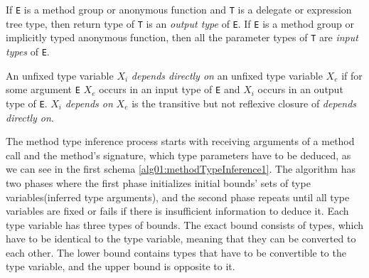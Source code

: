\begin{defn}
If \texttt{E} is a method group or anonymous function and \texttt{T} is a delegate or expression tree type, then return type of \texttt{T} is an \emph{output type} of \texttt{E}.
If \texttt{E} is a method group or implicitly typed anonymous function, then all the parameter types of \texttt{T} are \emph{input types} of \texttt{E}. 
\end{defn}
\par
\begin{defn}[Dependence]
An unfixed type variable \texttt{$X_i$} \emph{depends directly on} an unfixed type variable \texttt{$X_e$} if for some argument \texttt{E} \texttt{$X_e$} occurs in an input type of \texttt{E} and \texttt{$X_i$} occurs in an output type of \texttt{E}.
\texttt{$X_i$} \emph{depends on} \texttt{$X_e$} is the transitive but not reflexive closure of \emph{depends directly on}.
\end{defn}
\par
{}
The method type inference process starts with receiving arguments of a method call and the method's signature, which type parameters have to be deduced, as we can see in the first schema \ref{alg01:methodTypeInference1}.
The algorithm has two phases where the first phase initializes initial bounds' sets of type variables(inferred type arguments), and the second phase repeats until all type variables are fixed or fails if there is insufficient information to deduce it.
Each type variable has three types of bounds. 
The exact bound consists of types, which have to be identical to the type variable, meaning that they can be converted to each other.
The lower bound contains types that have to be convertible to the type variable, and the upper bound is opposite to it. 
\par
